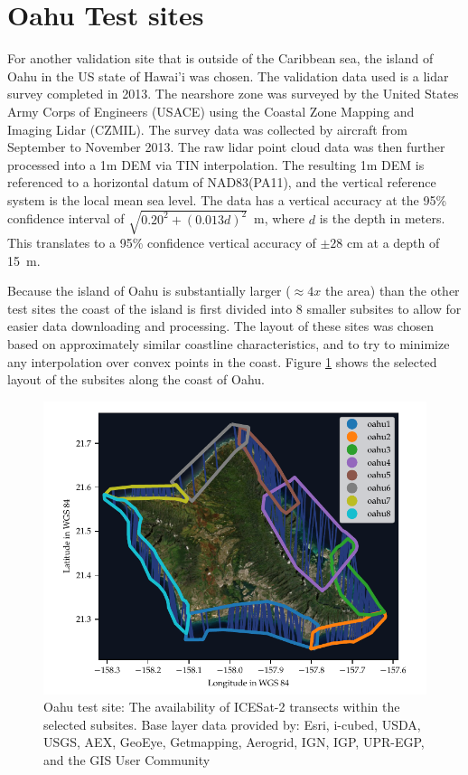 


\section{Oahu Test sites}\label{sec:oahuresults}

For another validation site that is outside of the Caribbean sea, the island of Oahu in the US state of Hawai'i was chosen. The validation data used is a lidar survey completed in 2013. The nearshore zone was surveyed by the United States Army Corps of Engineers (USACE) using the Coastal Zone Mapping and Imaging Lidar (CZMIL). The survey data was collected by aircraft from September to November 2013. The raw lidar point cloud data was then further processed into a 1m DEM via TIN interpolation. The resulting 1m DEM is referenced to a horizontal datum of NAD83(PA11), and the vertical reference system is the local mean sea level. The data has a vertical accuracy at the 95\% confidence interval of $\sqrt{0.20^2 + (0.013d)^2}$~m, where $d$ is the depth in meters. This translates to a 95\% confidence vertical accuracy of $\pm 28$ cm at a depth of 15~m.

Because the island of Oahu is substantially larger ($\approx 4x$ the area) than the other test sites the coast of the island is first divided into 8 smaller subsites to allow for easier data downloading and processing. The layout of these sites was chosen based on approximately similar coastline characteristics, and to try to minimize any interpolation over convex points in the coast. Figure \ref{fig:oahu-subsite-layout} shows the selected layout of the subsites along the coast of Oahu.

\begin{figure}[htbp]
    \centering
    \includegraphics{figures/Oahu_all_tracklines.pdf}
    \caption[Oahu test site: Transects and subsite layout]{Oahu test site: The availability of ICESat-2 transects within the selected subsites. Base layer data provided by: Esri, i-cubed, USDA, USGS, AEX, GeoEye, Getmapping, Aerogrid, IGN, IGP, UPR-EGP, and the GIS User Community}
    \label{fig:oahu-subsite-layout}
\end{figure}

